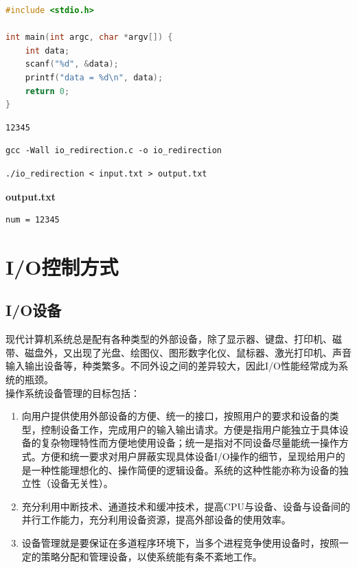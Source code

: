 \begin{lstlisting}[language=C]
#include <stdio.h>

int main(int argc, char *argv[]) {
    int data;
    scanf("%d", &data);
    printf("data = %d\n", data);
    return 0;
}
\end{lstlisting}

\begin{lstlisting}[title=input.txt]
12345
\end{lstlisting}

\begin{lstlisting}[title=编译]
gcc -Wall io_redirection.c -o io_redirection
\end{lstlisting}

\begin{lstlisting}[title=运行]
./io_redirection < input.txt > output.txt
\end{lstlisting}

\begin{tcolorbox}
	\textbf{output.txt}
	\begin{verbatim}
num = 12345
	\end{verbatim}
\end{tcolorbox}

\newpage

\section{I/O控制方式}

\subsection{I/O设备}

现代计算机系统总是配有各种类型的外部设备，除了显示器、键盘、打印机、磁带、磁盘外，又出现了光盘、绘图仪、图形数字化仪、鼠标器、激光打印机、声音输入输出设备等，种类繁多。不同外设之间的差异较大，因此I/O性能经常成为系统的瓶颈。\\

操作系统设备管理的目标包括：

\begin{enumerate}
	\item 向用户提供使用外部设备的方便、统一的接口，按照用户的要求和设备的类型，控制设备工作，完成用户的输入输出请求。方便是指用户能独立于具体设备的复杂物理特性而方便地使用设备；统一是指对不同设备尽量能统一操作方式。方便和统一要求对用户屏蔽实现具体设备I/O操作的细节，呈现给用户的是一种性能理想化的、操作简便的逻辑设备。系统的这种性能亦称为设备的独立性（设备无关性）。

	\item 充分利用中断技术、通道技术和缓冲技术，提高CPU与设备、设备与设备间的并行工作能力，充分利用设备资源，提高外部设备的使用效率。

	\item 设备管理就是要保证在多道程序环境下，当多个进程竞争使用设备时，按照一定的策略分配和管理设备，以使系统能有条不紊地工作。
\end{enumerate}

